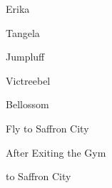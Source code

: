 \begin{paracol}{2}
\begin{boss}{Erika}
	\varwb
	\begin{fightSection}{Tangela}
		\item {} \icePunch
	\end{fightSection}
	\begin{fightSection}{Jumpluff}
		\item {} \return
	\end{fightSection}
	\begin{fightSection}{Victreebel}
		\item \xAttack
		\item {} \return
	\end{fightSection}
	\begin{fightSection}{Bellossom}
		\item {} \return
	\end{fightSection}
	\varwe
\end{boss}

\switchcolumn*
\vspace{-3.55cm}
\begin{story}{Fly to Saffron City}
	\varwb
	\varwe
\end{story}

\switchcolumn
\begin{menu}{After Exiting the Gym}
	\varwb
	\begin{pokeMenu}
		\item {} \fly{} to Saffron City \menuHlTwo{(\pointDown)}
	\end{pokeMenu}
	\varwe
\end{menu}

\end{paracol}
\vspace{3.5mm} 